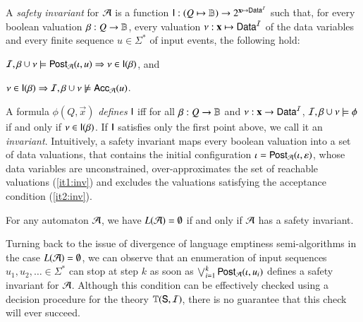 \documentclass[10pt,conference,letterpaper,twocolumn]{IEEEtran}
\begin{document}
A \emph{safety invariant} for $\mathcal{A}$ is a function $\mathsf{I} : (Q \mapsto
\mathbb{B}) \rightarrow 2^{\mathbf x \mapsto \mathsf{Data}^{\mathcal{I}}}$ such that, for every
boolean valuation $\beta : Q \rightarrow \mathbb{B}$, every valuation $\nu
: \mathbf x \mapsto \mathsf{Data}^{\mathcal{I}}$ of the data variables and every finite
sequence $u \in \Sigma^*$ of input events, the following
hold: \begin{compactenum}
%
\item\label{it1:inv} $\mathcal{I},\beta \cup \nu \models \mathsf{Post}_{\mathcal{A}}(\iota,u)
  \Rightarrow \nu \in \mathsf{I}(\beta)$, and
%
\item\label{it2:inv} $\nu \in \mathsf{I}(\beta) \Rightarrow \mathcal{I},\beta \cup
  \nu \not\models \mathsf{Acc}_{\mathcal{A}}(u)$.
\end{compactenum}
A formula $\phi(Q,\vec{x})$ \emph{defines} $\mathsf{I}$ iff for all $\beta:
Q \rightarrow \mathbb{B}$ and $\nu : \mathbf x \rightarrow \mathsf{Data}^{\mathcal{I}}$,
$\mathcal{I},\beta\cup\nu \models \phi$ if and only if $\nu \in
\mathsf{I}(\beta)$. If $\mathsf{I}$ satisfies only the first point above, we call
it an \emph{invariant}. Intuitively, a safety invariant maps every
boolean valuation into a set of data valuations, that contains the
initial configuration $\iota = \mathsf{Post}_{\mathcal{A}}(\iota,\varepsilon)$, whose
data variables are unconstrained, over-approximates the set of
reachable valuations (\ref{it1:inv}) and excludes the valuations
satisfying the acceptance condition (\ref{it2:inv}).

\begin{lemma}\label{lemma:safety-invariant}
  For any automaton $\mathcal{A}$, we have $L(\mathcal{A}) = \emptyset$ if and only if
  $\mathcal{A}$ has a safety invariant.
\end{lemma}

Turning back to the issue of divergence of language emptiness
semi-algorithms in the case $L(\mathcal{A}) = \emptyset$, we can observe that
an enumeration of input sequences $u_1,u_2,\ldots \in \Sigma^*$ can
stop at step $k$ as soon as $\bigvee_{i=1}^k \mathsf{Post}_{\mathcal{A}}(\iota,u_i)$
defines a safety invariant for $\mathcal{A}$. Although this condition can be
effectively checked using a decision procedure for the theory
$\mathbb{T}(\mathsf{S},\mathcal{I})$, there is no guarantee that this check will ever
succeed.
\end{document}
